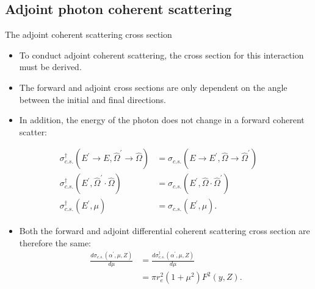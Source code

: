 \documentclass{beamer}
\begin{document}
\subsection{Adjoint photon coherent scattering}
\begin{frame}{The adjoint coherent scattering cross section}

  \begin{itemize}
    \item To conduct adjoint coherent scattering, the cross section for this
      interaction must be derived.
    \item The forward and adjoint cross sections are only dependent on the angle
      between the initial and final directions.
    \item In addition, the energy of the photon does not change in a forward
      coherent scatter:
  \end{itemize}
  \begin{align}
  \sigma_{c.s.}^{\dagger}(E^{'} \to E, \hat{\Omega}^{'} \to \hat{\Omega}) & =
  \sigma_{c.s.}(E \to E^{'},\hat{\Omega} \to \hat{\Omega}^{'}) \nonumber \\
  \sigma_{c.s.}^{\dagger}(E^{'}, \hat{\Omega}^{'} \cdot \hat{\Omega}) & = 
  \sigma_{c.s.}(E^{'},\hat{\Omega} \cdot \hat{\Omega}^{'}) \nonumber \\
  \sigma_{c.s.}^{\dagger}(E^{'}, \mu) & = \sigma_{c.s.}(E^{'}, \mu). \nonumber
\end{align}

  \begin{itemize}
    \item Both the forward and adjoint differential coherent scattering cross
      section are therefore the same:
      \begin{align}
        \frac{d\sigma_{c.s.}(\alpha^{'},\mu,Z)}{d\mu} & = 
        \frac{d\sigma_{c.s.}^{\dagger}(\alpha^{'},\mu,Z)}{d\mu} \nonumber \\
        & = \pi r_e^2 (1 + \mu^2)F^2(y,Z). \nonumber
      \end{align}
  \end{itemize}

\end{frame}

\end{document}
